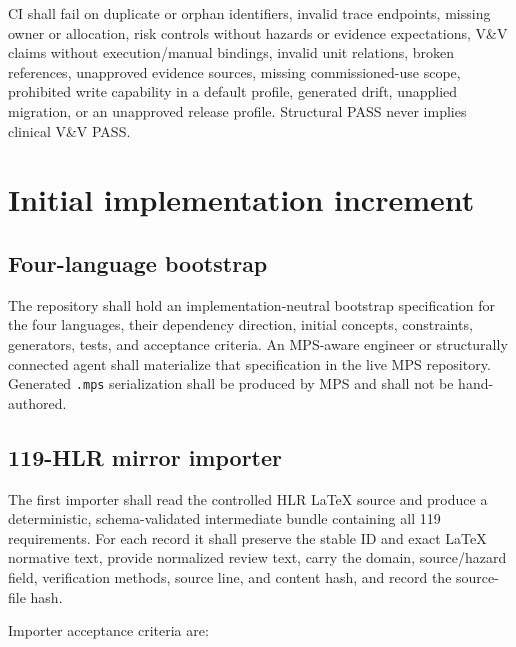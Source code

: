 \documentclass[11pt,letterpaper]{article}
\begin{document}
CI shall fail on duplicate or orphan identifiers, invalid trace endpoints, missing owner or allocation, risk controls without hazards or evidence expectations, V\&V claims without execution/manual bindings, invalid unit relations, broken references, unapproved evidence sources, missing commissioned-use scope, prohibited write capability in a default profile, generated drift, unapplied migration, or an unapproved release profile. Structural PASS never implies clinical V\&V PASS.

\section{Initial implementation increment}

\subsection{Four-language bootstrap}

The repository shall hold an implementation-neutral bootstrap specification for the four languages, their dependency direction, initial concepts, constraints, generators, tests, and acceptance criteria. An MPS-aware engineer or structurally connected agent shall materialize that specification in the live MPS repository. Generated \texttt{.mps} serialization shall be produced by MPS and shall not be hand-authored.

\subsection{119-HLR mirror importer}

The first importer shall read the controlled HLR LaTeX source and produce a deterministic, schema-validated intermediate bundle containing all 119 requirements. For each record it shall preserve the stable ID and exact LaTeX normative text, provide normalized review text, carry the domain, source/hazard field, verification methods, source line, and content hash, and record the source-file hash.

Importer acceptance criteria are:
\end{document}
